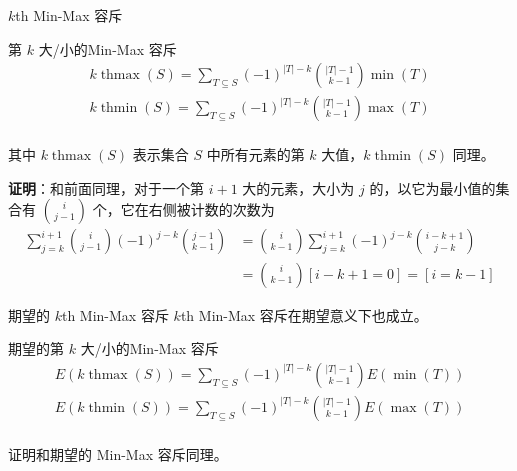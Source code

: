 \documentclass[UTF8]{beamer}
\begin{document}
    \begin{frame}{$k$th Min-Max 容斥}
        \begin{block}{第 $k$ 大/小的Min-Max 容斥}
            \vspace{-2em}
            \begin{gather*}
                k\operatorname{thmax}(S) = \sum_{T\subseteq S}(-1)^{|T|-k}\binom{|T|-1}{k-1}\min(T)\\
                k\operatorname{thmin}(S) = \sum_{T\subseteq S}(-1)^{|T|-k}\binom{|T|-1}{k-1}\max(T)\\
            \end{gather*}

            \vspace{-2em}
            其中 $k\operatorname{thmax} (S)$ 表示集合 $S$ 中所有元素的第 $k$ 大值，$k\operatorname{thmin} (S)$ 同理。
        \end{block}
        \pause
        \textbf{证明}：和前面同理，对于一个第 $i+1$ 大的元素，大小为 $j$ 的，以它为最小值的集合有 $\binom{i}{j-1}$ 个，它在右侧被计数的次数为
        \vspace{-0.6em}
        $$
        \begin{aligned}
        \sum_{j=k}^{i+1}\binom{i}{j-1}(-1)^{j-k}\binom{j-1}{k-1} &=\binom{i}{k-1}\sum_{j=k}^{i+1}(-1)^{j-k}\binom{i-k+1}{j-k}\\
        &=\binom{i}{k-1}[i-k+1=0]=[i=k-1]
        \end{aligned}
        $$
    \end{frame}

    \begin{frame}{期望的 $k$th Min-Max 容斥}
        $k$th Min-Max 容斥在期望意义下也成立。
        
        \begin{block}{期望的第 $k$ 大/小的Min-Max 容斥}
            \vspace{-2em}
            \begin{gather*}
                E(k\operatorname{thmax}(S)) = \sum_{T\subseteq S}(-1)^{|T|-k}\binom{|T|-1}{k-1}E(\min(T))\\
                E(k\operatorname{thmin}(S)) = \sum_{T\subseteq S}(-1)^{|T|-k}\binom{|T|-1}{k-1}E(\max(T))\\
            \end{gather*}
            \vspace{-3em}
        \end{block}
        证明和期望的 Min-Max 容斥同理。
    \end{frame}
\end{document}
